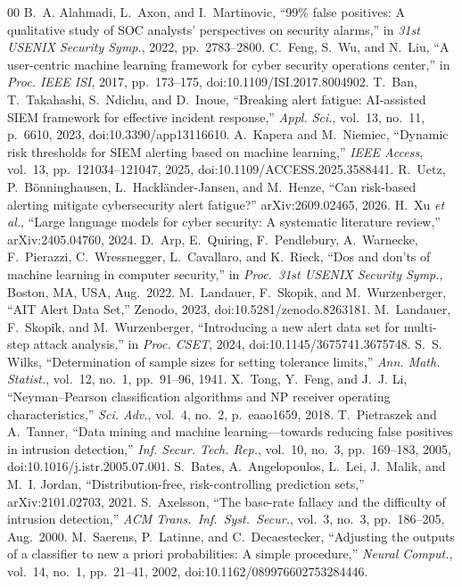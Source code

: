 \documentclass[conference]{IEEEtran}
\begin{document}
\begin{thebibliography}{00}
 B.~A. Alahmadi, L.~Axon, and I.~Martinovic, ``99\% false positives: A
qualitative study of SOC analysts' perspectives on security alarms,'' in \emph{31st USENIX
Security Symp.}, 2022, pp.~2783--2800.
 C.~Feng, S.~Wu, and N.~Liu, ``A user-centric machine learning framework
for cyber security operations center,'' in \emph{Proc. IEEE ISI}, 2017, pp.~173--175,
doi:10.1109/ISI.2017.8004902.
 T.~Ban, T.~Takahashi, S.~Ndichu, and D.~Inoue, ``Breaking alert fatigue:
AI-assisted SIEM framework for effective incident response,'' \emph{Appl. Sci.}, vol.~13,
no.~11, p.~6610, 2023, doi:10.3390/app13116610.
 A.~Kapera and M.~Niemiec, ``Dynamic risk thresholds for SIEM alerting
based on machine learning,'' \emph{IEEE Access}, vol.~13, pp.~121034--121047, 2025,
doi:10.1109/ACCESS.2025.3588441.
 R.~Uetz, P.~B{\"o}nninghausen, L.~Hackl{\"a}nder-Jansen, and M.~Henze,
``Can risk-based alerting mitigate cybersecurity alert fatigue?'' arXiv:2609.02465, 2026.
 H.~Xu \emph{et al.}, ``Large language models for cyber security: A
systematic literature review,'' arXiv:2405.04760, 2024.
 D.~Arp, E.~Quiring, F.~Pendlebury, A.~Warnecke, F.~Pierazzi, C.~Wressnegger,
L.~Cavallaro, and K.~Rieck, ``Dos and don'ts of machine learning in computer security,'' in
\emph{Proc.\ 31st USENIX Security Symp.}, Boston, MA, USA, Aug.\ 2022.
 M.~Landauer, F.~Skopik, and M.~Wurzenberger, ``AIT Alert Data Set,''
Zenodo, 2023, doi:10.5281/zenodo.8263181.
 M.~Landauer, F.~Skopik, and M.~Wurzenberger, ``Introducing a new alert
data set for multi-step attack analysis,'' in \emph{Proc. CSET}, 2024,
doi:10.1145/3675741.3675748.
 S.~S. Wilks, ``Determination of sample sizes for setting tolerance
limits,'' \emph{Ann. Math. Statist.}, vol.~12, no.~1, pp.~91--96, 1941.
 X.~Tong, Y.~Feng, and J.~J. Li, ``Neyman--Pearson classification algorithms
and NP receiver operating characteristics,'' \emph{Sci. Adv.}, vol.~4, no.~2, p.~eaao1659, 2018.
 T.~Pietraszek and A.~Tanner, ``Data mining and machine
learning---towards reducing false positives in intrusion detection,'' \emph{Inf. Secur.
Tech. Rep.}, vol.~10, no.~3, pp.~169--183, 2005, doi:10.1016/j.istr.2005.07.001.
 S.~Bates, A.~Angelopoulos, L.~Lei, J.~Malik, and M.~I. Jordan,
``Distribution-free, risk-controlling prediction sets,'' arXiv:2101.02703, 2021.
 S.~Axelsson, ``The base-rate fallacy and the difficulty of intrusion
detection,'' \emph{ACM Trans.\ Inf.\ Syst.\ Secur.}, vol.~3, no.~3, pp.~186--205, Aug.\ 2000.
 M.~Saerens, P.~Latinne, and C.~Decaestecker, ``Adjusting the outputs of a
classifier to new a priori probabilities: A simple procedure,'' \emph{Neural Comput.}, vol.~14,
no.~1, pp.~21--41, 2002, doi:10.1162/089976602753284446.
\end{thebibliography}
\end{document}

